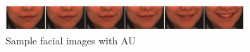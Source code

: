 \begin{figure}[!htb]	\includegraphics[width=0.8\textwidth]{images/DISFA.png} 
    \centering

\caption{Sample facial images with AU \cite{Mavadati2013DISFA:Database} } 

\label{fig:disfa}
\end{figure}
